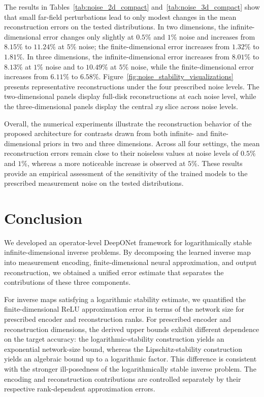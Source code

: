 \documentclass{article}
\numberwithin{equation}{section}
\theoremstyle{plain}
\begin{document}
The results in Tables~\ref{tab:noise_2d_compact} and~\ref{tab:noise_3d_compact} show that small far-field perturbations lead to only modest changes in the mean reconstruction errors on the tested distributions.  In two dimensions, the infinite-dimensional error changes only slightly at $0.5\%$ and $1\%$ noise and increases from $8.15\%$ to $11.24\%$ at $5\%$ noise; the finite-dimensional error increases from $1.32\%$ to $1.81\%$.  In three dimensions, the infinite-dimensional error increases from $8.01\%$ to $8.13\%$ at $1\%$ noise and to $10.49\%$ at $5\%$ noise, while the finite-dimensional error increases from $6.11\%$ to $6.58\%$. Figure~\ref{fig:noise_stability_visualizations} presents representative reconstructions under the four prescribed noise levels. The two-dimensional panels display full-disk reconstructions at each noise level, while the three-dimensional panels display the central $xy$ slice across noise levels. 

Overall, the numerical experiments illustrate the reconstruction behavior of the proposed architecture for contrasts drawn from both infinite- and finite-dimensional priors in two and three dimensions. Across all four settings, the mean reconstruction errors remain close to their noiseless values at noise levels of $0.5\%$ and $1\%$, whereas a more noticeable increase is observed at $5\%$. These results provide an empirical assessment of the sensitivity of the trained models to the prescribed measurement noise on the tested distributions.



\section{Conclusion}\label{section5}
We developed an operator-level DeepONet framework for logarithmically stable infinite-dimensional inverse problems. By decomposing the learned inverse map into measurement encoding, finite-dimensional neural approximation, and output reconstruction, we obtained a unified error estimate that separates the contributions of these three components.

For inverse maps satisfying a logarithmic stability estimate, we quantified the finite-dimensional ReLU approximation error in terms of the network size for prescribed encoder and reconstruction ranks. For prescribed encoder and reconstruction dimensions, the derived upper bounds exhibit different dependence on the target accuracy: the logarithmic-stability construction yields an exponential network-size bound, whereas the Lipschitz-stability construction yields an algebraic bound up to a logarithmic factor. This difference is consistent with the stronger ill-posedness of the logarithmically stable inverse problem. The encoding and reconstruction contributions are controlled separately by their respective rank-dependent approximation errors.
\end{document}
